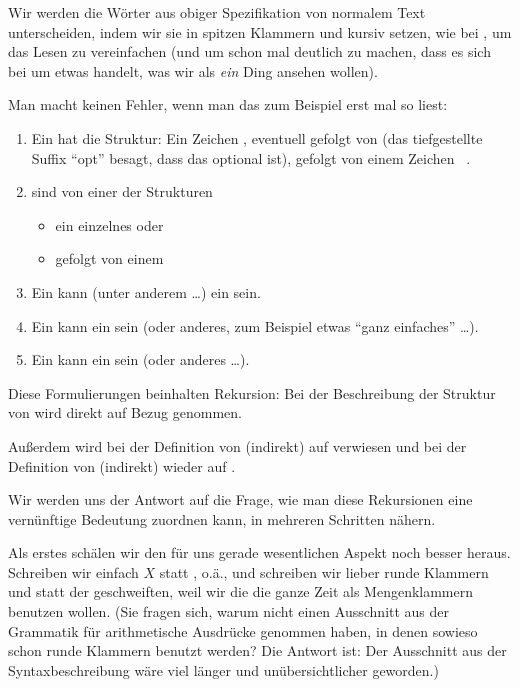 \noindent

Wir werden die Wörter aus obiger Spezifikation von normalem Text
unterscheiden, indem wir sie in spitzen Klammern und kursiv setzen,
wie \zB bei , um das Lesen zu vereinfachen (und um schon
mal deutlich zu machen, dass es sich \zB bei  um etwas
handelt, was wir als \emph{ein} Ding ansehen wollen).

Man macht keinen Fehler, wenn man das zum Beispiel erst mal so liest:

%
\begin{enumerate}
\item Ein  hat die Struktur: Ein Zeichen \literal{\{} ,
  eventuell gefolgt von  (das tiefgestellte
  Suffix "`opt"' besagt, dass das optional ist), gefolgt von einem
  Zeichen \literal{\}}\ .
\item {} sind von einer der Strukturen
  \begin{itemize}
  \item ein einzelnes  oder
  \item {} gefolgt von einem 
  \end{itemize}
\item Ein  kann (unter anderem \dots) ein
   sein.
\item Ein  kann ein
   sein (oder
  anderes, zum Beispiel etwas "`ganz einfaches"' \dots).
\item Ein  kann ein
   sein (oder anderes \dots).
\end{enumerate}
%
Diese Formulierungen beinhalten Rekursion: Bei der Beschreibung der
Struktur von  wird direkt auf
 Bezug genommen.

Außerdem wird bei der Definition von  (indirekt) auf
 verwiesen und bei der Definition von
 (indirekt) wieder auf .

Wir werden uns der Antwort auf die Frage, wie man diese Rekursionen
eine vernünftige Bedeutung zuordnen kann, in mehreren Schritten
nähern.

Als erstes schälen wir den für uns gerade wesentlichen Aspekt noch
besser heraus. Schreiben wir einfach $X$ statt ,
 o.ä., und schreiben wir lieber runde Klammern
\literal{(} und \literal{)} statt der geschweiften, weil wir die die
ganze Zeit als Mengenklammern benutzen wollen. (Sie fragen sich, warum
nicht einen Ausschnitt aus der Grammatik für arithmetische Ausdrücke
genommen haben, in denen sowieso schon runde Klammern benutzt werden?
Die Antwort ist: Der Ausschnitt aus der Syntaxbeschreibung wäre viel
länger und unübersichtlicher geworden.)

